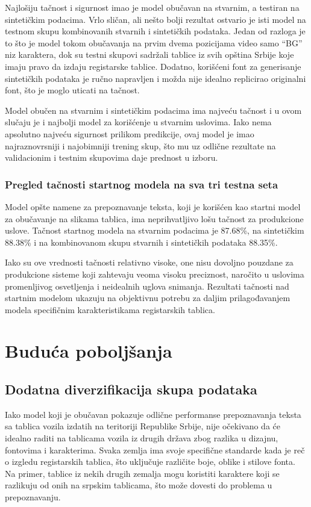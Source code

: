 \documentclass[a4paper,12pt]{article}
\begin{document}
	Najlošiju tačnost i sigurnost imao je model obučavan na stvarnim, a testiran na sintetičkim podacima. Vrlo sličan, ali nešto bolji rezultat ostvario je isti model na testnom skupu kombinovanih stvarnih i sintetičkih podataka. Jedan od razloga je to što je model tokom obučavanja na prvim dvema pozicijama video samo \enquote{BG} niz karaktera, dok su testni skupovi sadržali tablice iz svih opština Srbije koje imaju pravo da izdaju registarske tablice. Dodatno, korišćeni font za generisanje sintetičkih podataka je ručno napravljen i možda nije idealno replicirao originalni font, što je moglo uticati na tačnost.
	
	Model obučen na stvarnim i sintetičkim podacima ima najveću tačnost i u ovom slučaju je i najbolji model za korišćenje u stvarnim uslovima. Iako nema apsolutno najveću sigurnost prilikom predikcije, ovaj model je imao najraznovrsniji i najobimniji trening skup, što mu uz odlične rezultate na validacionim i testnim skupovima daje prednost u izboru.
	
	\subsubsection{Pregled tačnosti startnog modela na sva tri testna seta}
	Model opšte namene za prepoznavanje teksta, koji je korišćen kao startni model za obučavanje na slikama tablica, ima neprihvatljivo lošu tačnost za produkcione uslove. Tačnost startnog modela na stvarnim podacima je 87.68\%, na sintetičkim 88.38\% i na kombinovanom skupu stvarnih i sintetičkih podataka 88.35\%.
	
	Iako su ove vrednosti tačnosti relativno visoke, one nisu dovoljno pouzdane za produkcione sisteme koji zahtevaju veoma visoku preciznost, naročito u uslovima promenljivog osvetljenja i neidealnih uglova snimanja. Rezultati tačnosti nad startnim modelom ukazuju na objektivnu potrebu za daljim prilagođavanjem modela specifičnim karakteristikama registarskih tablica.
	\newpage
	
	\section{Buduća poboljšanja}
	
	\subsection{Dodatna diverzifikacija skupa podataka}
	Iako model koji je obučavan pokazuje odlične performanse prepoznavanja teksta sa tablica vozila izdatih na teritoriji Republike Srbije, nije očekivano da će idealno raditi na tablicama vozila iz drugih država zbog razlika u dizajnu, fontovima i karakterima. Svaka zemlja ima svoje specifične standarde kada je reč o izgledu registarskih tablica, što uključuje različite boje, oblike i stilove fonta. Na primer, tablice iz nekih drugih zemalja mogu koristiti karaktere koji se razlikuju od onih na srpskim tablicama, što može dovesti do problema u prepoznavanju.
	
\end{document}
